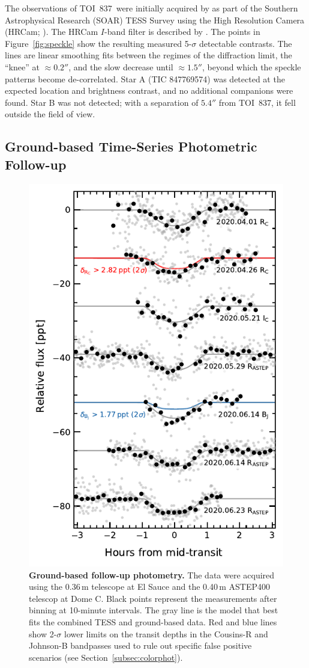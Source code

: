 \documentclass[12pt,twocolumn,tighten]{aastex63}
\newcommand{\tn}{TOI~837} %
\begin{document}
The observations of \tn\ were initially acquired by
\citet{ziegler_soar_2020} as part of the Southern Astrophysical
Research (SOAR) TESS Survey using the High Resolution Camera (HRCam;
\citealt{tokovinin_ten_2018}).  The HRCam $I$-band filter is described
by \citet{tokovinin_ten_2018}.  The points in Figure~\ref{fig:speckle}
show the resulting measured 5-$\sigma$ detectable contrasts.  The
lines are linear smoothing fits between the regimes of the diffraction
limit, the ``knee'' at $\approx 0.2''$, and the slow decrease until
$\approx 1.5''$, beyond which the speckle patterns become
de-correlated.  Star A (TIC 847769574) was detected at the expected
location and brightness contrast, and no additional companions were
found.  Star B was not detected; with a separation of $5.4''$ from
\tn, it fell outside the field of view.




\subsection{Ground-based Time-Series Photometric Follow-up}
\label{subsec:groundphot}


\begin{figure}[!t]
	\begin{center}
		\leavevmode
		\includegraphics[width=.48\textwidth]{f3.pdf}
	\end{center}
	\vspace{-0.7cm}
	\caption{
    {\bf Ground-based follow-up photometry.} The data were acquired
    using the 0.36$\,$m telescope at El Sauce and the 0.40$\,$m
    ASTEP400 telescop at Dome C.  Black points represent the
    measurements after binning at 10-minute intervals. The gray line
    is the model that best fits the combined TESS and ground-based
    data.  Red and blue lines show 2-$\sigma$ lower limits on the
    transit depths in the Cousins-R and Johnson-B bandpasses used to
    rule out specific false positive scenarios (see
    Section~\ref{subsec:colorphot}).
		\label{fig:groundphot}
	}
\end{figure}
\end{document}
